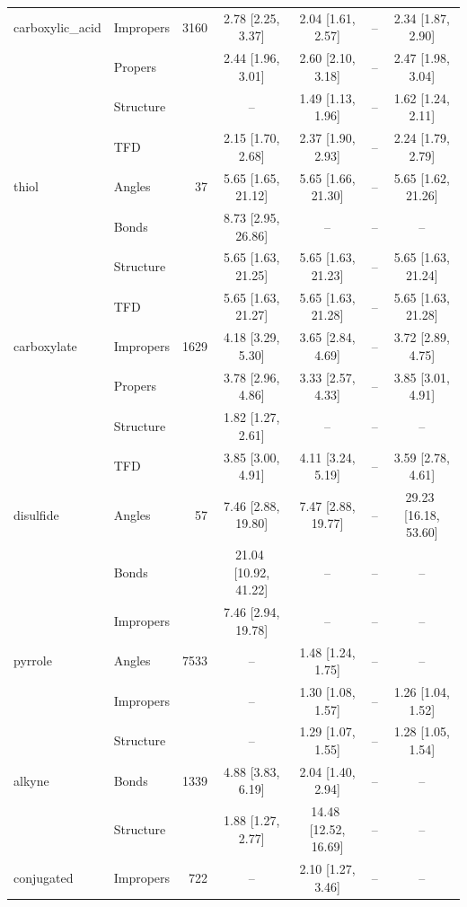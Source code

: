 \begin{longtable}[c]{ ll | r | c c c c}
    carboxylic\_acid & Impropers & 3160 & 2.78\,\,[2.25, 3.37] & 2.04\,\,[1.61, 2.57] & -- & 2.34\,\,[1.87, 2.90] \\
     & Propers &  & 2.44\,\,[1.96, 3.01] & 2.60\,\,[2.10, 3.18] & -- & 2.47\,\,[1.98, 3.04] \\
     & Structure &  & -- & 1.49\,\,[1.13, 1.96] & -- & 1.62\,\,[1.24, 2.11] \\
     & TFD &  & 2.15\,\,[1.70, 2.68] & 2.37\,\,[1.90, 2.93] & -- & 2.24\,\,[1.79, 2.79] \\
    \hline
    thiol & Angles & 37 & 5.65\,\,[1.65, 21.12] & 5.65\,\,[1.66, 21.30] & -- & 5.65\,\,[1.62, 21.26] \\
     & Bonds &  & 8.73\,\,[2.95, 26.86] & -- & -- & -- \\
     & Structure &  & 5.65\,\,[1.63, 21.25] & 5.65\,\,[1.63, 21.23] & -- & 5.65\,\,[1.63, 21.24] \\
     & TFD &  & 5.65\,\,[1.63, 21.27] & 5.65\,\,[1.63, 21.28] & -- & 5.65\,\,[1.63, 21.28] \\
    \hline
    carboxylate & Impropers & 1629 & 4.18\,\,[3.29, 5.30] & 3.65\,\,[2.84, 4.69] & -- & 3.72\,\,[2.89, 4.75] \\
     & Propers &  & 3.78\,\,[2.96, 4.86] & 3.33\,\,[2.57, 4.33] & -- & 3.85\,\,[3.01, 4.91] \\
     & Structure &  & 1.82\,\,[1.27, 2.61] & -- & -- & -- \\
     & TFD &  & 3.85\,\,[3.00, 4.91] & 4.11\,\,[3.24, 5.19] & -- & 3.59\,\,[2.78, 4.61] \\
    \hline
    disulfide & Angles & 57 & 7.46\,\,[2.88, 19.80] & 7.47\,\,[2.88, 19.77] & -- & 29.23\,\,[16.18, 53.60] \\
     & Bonds &  & 21.04\,\,[10.92, 41.22] & -- & -- & -- \\
     & Impropers &  & 7.46\,\,[2.94, 19.78] & -- & -- & -- \\
    \hline
    pyrrole & Angles & 7533 & -- & 1.48\,\,[1.24, 1.75] & -- & -- \\
     & Impropers &  & -- & 1.30\,\,[1.08, 1.57] & -- & 1.26\,\,[1.04, 1.52] \\
     & Structure &  & -- & 1.29\,\,[1.07, 1.55] & -- & 1.28\,\,[1.05, 1.54] \\
    \hline
    alkyne & Bonds & 1339 & 4.88\,\,[3.83, 6.19] & 2.04\,\,[1.40, 2.94] & -- & -- \\
     & Structure &  & 1.88\,\,[1.27, 2.77] & 14.48\,\,[12.52, 16.69] & -- & -- \\
    \hline
    conjugated & Impropers & 722 & -- & 2.10\,\,[1.27, 3.46] & -- & -- \\

\end{longtable}
